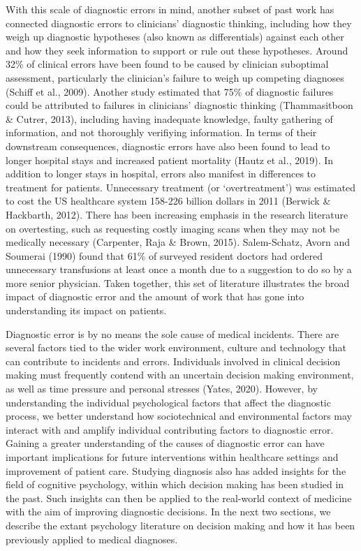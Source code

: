 \documentclass[a4paper, nobind]{templates/ociamthesis}
\begin{document}
\hfill\break
With this scale of diagnostic errors in mind, another subset of past work has connected diagnostic errors to clinicians' diagnostic thinking, including how they weigh up diagnostic hypotheses (also known as differentials) against each other and how they seek information to support or rule out these hypotheses. Around 32\% of clinical errors have been found to be caused by clinician suboptimal assessment, particularly the clinician's failure to weigh up competing diagnoses (Schiff et al., 2009). Another study estimated that 75\% of diagnostic failures could be attributed to failures in clinicians' diagnostic thinking (Thammasitboon \& Cutrer, 2013), including having inadequate knowledge, faulty gathering of information, and not thoroughly verifiying information. In terms of their downstream consequences, diagnostic errors have also been found to lead to longer hospital stays and increased patient mortality (Hautz et al., 2019). In addition to longer stays in hospital, errors also manifest in differences to treatment for patients. Unnecessary treatment (or `overtreatment') was estimated to cost the US healthcare system 158-226 billion dollars in 2011 (Berwick \& Hackbarth, 2012). There has been increasing emphasis in the research literature on overtesting, such as requesting costly imaging scans when they may not be medically necessary (Carpenter, Raja \& Brown, 2015). Salem-Schatz, Avorn and Soumerai (1990) found that 61\% of surveyed resident doctors had ordered unnecessary transfusions at least once a month due to a suggestion to do so by a more senior physician. Taken together, this set of literature illustrates the broad impact of diagnostic error and the amount of work that has gone into understanding its impact on patients.

\hfill\break
Diagnostic error is by no means the sole cause of medical incidents. There are several factors tied to the wider work environment, culture and technology that can contribute to incidents and errors. Individuals involved in clinical decision making must frequently contend with an uncertain decision making environment, as well as time pressure and personal stresses (Yates, 2020). However, by understanding the individual psychological factors that affect the diagnostic process, we better understand how sociotechnical and environmental factors may interact with and amplify individual contributing factors to diagnostic error. Gaining a greater understanding of the causes of diagnostic error can have important implications for future interventions within healthcare settings and improvement of patient care. Studying diagnosis also has added insights for the field of cognitive psychology, within which decision making has been studied in the past. Such insights can then be applied to the real-world context of medicine with the aim of improving diagnostic decisions. In the next two sections, we describe the extant psychology literature on decision making and how it has been previously applied to medical diagnoses.
\end{document}
